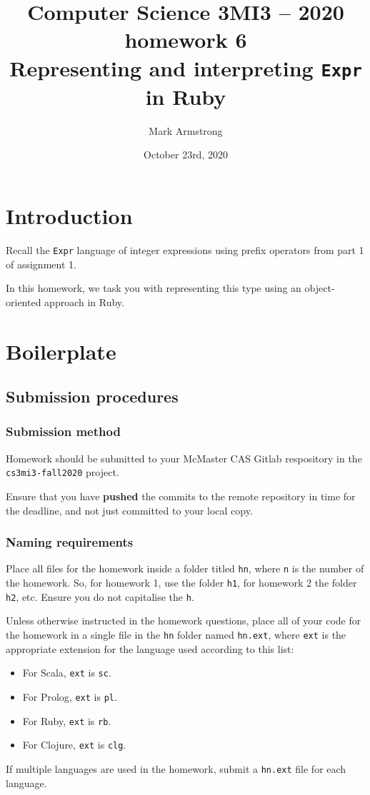 \documentclass[11pt]{article}
\author{Mark Armstrong}
\date{October 23rd, 2020}
\title{Computer Science 3MI3 – 2020 homework 6\\\medskip
\large Representing and interpreting \texttt{Expr} in Ruby}
\begin{document}
\maketitle
\tableofcontents


\section*{Introduction}
\label{sec:orgc6ce153}
Recall the \texttt{Expr} language of integer expressions
using prefix operators from part 1 of assignment 1.

In this homework, we task you with representing this type
using an object-oriented approach in Ruby.

\section*{Boilerplate}
\label{sec:orgbce4191}
\subsection*{Submission procedures}
\label{sec:org5694653}
\subsubsection*{Submission method}
\label{sec:orgbafe198}

Homework should be submitted to your McMaster CAS Gitlab respository
in the \texttt{cs3mi3-fall2020} project.

Ensure that you have \textbf{pushed} the commits to the remote repository
in time for the deadline, and not just committed to your local copy.

\subsubsection*{Naming requirements}
\label{sec:org844b9d6}

Place all files for the homework
inside a folder titled \texttt{hn}, where \texttt{n} is the number of the homework.
So, for homework 1, use the folder \texttt{h1}, for homework 2 the folder \texttt{h2}, etc.
Ensure you do not capitalise the \texttt{h}.

Unless otherwise instructed in the homework questions,
place all of your code for the homework
in a single file in the \texttt{hn} folder named \texttt{hn.ext},
where \texttt{ext} is the appropriate extension for the language used
according to this list:
\begin{itemize}
\item For Scala, \texttt{ext} is \texttt{sc}.
\item For Prolog, \texttt{ext} is \texttt{pl}.
\item For Ruby, \texttt{ext} is \texttt{rb}.
\item For Clojure, \texttt{ext} is \texttt{clg}.
\end{itemize}
If multiple languages are used in the homework,
submit a \texttt{hn.ext} file for each language.
\end{document}
